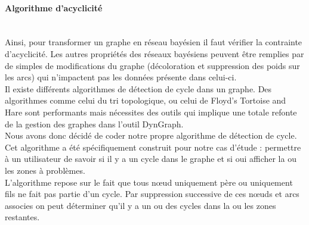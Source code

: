 \documentclass[conference]{IEEEtran}
\begin{document}
\paragraph{Algorithme d'acyclicité \hfill } 
\\
Ainsi, pour transformer un graphe en réseau bayésien il faut vérifier la contrainte d'acyclicité. Les autres propriétés des réseaux bayésiens peuvent être remplies par de simples de modifications du graphe (décoloration et suppression des poids sur les arcs) qui n'impactent pas les données présente dans celui-ci. \\
Il existe différents algorithmes de détection de cycle dans un graphe. Des algorithmes comme celui du tri topologique, ou celui de Floyd's Tortoise and Hare sont performants mais nécessites des outils qui implique une totale refonte de la gestion des graphes dans l'outil DynGraph. \\
Nous avons donc décidé de coder notre propre algorithme de détection de cycle. Cet algorithme a été spécifiquement construit pour notre cas d'étude : permettre à un utilisateur de savoir si il y a un cycle dans le graphe et si oui afficher la ou les zones à problèmes. \\
L'algorithme repose sur le fait que tous nœud uniquement père ou uniquement fils ne fait pas partie d'un cycle. Par suppression successive de ces nœuds et arcs associes on peut déterminer qu'il y a un ou des cycles dans la ou les zones restantes.  \\
\end{document}
